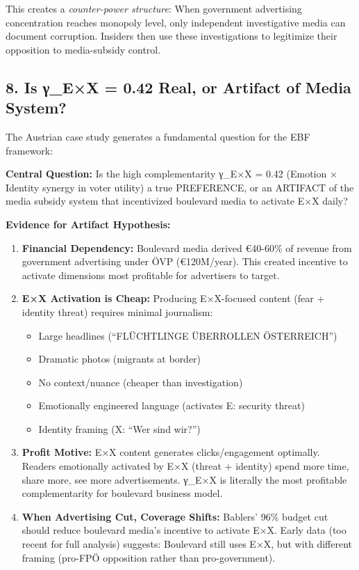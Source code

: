 This creates a \textit{counter-power structure}: When government advertising
concentration reaches monopoly level, only independent investigative media can
document corruption. Insiders then use these investigations to legitimize their
opposition to media-subsidy control.

\label{sec:dx-eex-implications}

\subsection*{8. Is γ_{E×X} = 0.42 Real, or Artifact of Media System?}

The Austrian case study generates a fundamental question for the EBF framework:

\textbf{Central Question:} Is the high complementarity γ_{E×X} = 0.42 (Emotion ×
Identity synergy in voter utility) a true PREFERENCE, or an ARTIFACT of the media
subsidy system that incentivized boulevard media to activate E×X daily?

\textbf{Evidence for Artifact Hypothesis:}

\begin{enumerate}
\item \textbf{Financial Dependency:} Boulevard media derived €40-60\% of revenue
  from government advertising under ÖVP (€120M/year). This created incentive to
  activate dimensions most profitable for advertisers to target.

\item \textbf{E×X Activation is Cheap:} Producing E×X-focused content (fear +
  identity threat) requires minimal journalism:
  \begin{itemize}
  \item Large headlines (``FLÜCHTLINGE ÜBERROLLEN ÖSTERREICH'')
  \item Dramatic photos (migrants at border)
  \item No context/nuance (cheaper than investigation)
  \item Emotionally engineered language (activates E: security threat)
  \item Identity framing (X: ``Wer sind wir?'')
  \end{itemize}

\item \textbf{Profit Motive:} E×X content generates clicks/engagement optimally.
  Readers emotionally activated by E×X (threat + identity) spend more time,
  share more, see more advertisements. γ_{E×X} is literally the most profitable
  complementarity for boulevard business model.

\item \textbf{When Advertising Cut, Coverage Shifts:} Bablers' 96\% budget cut
  should reduce boulevard media's incentive to activate E×X. Early data (too
  recent for full analysis) suggests: Boulevard still uses E×X, but with
  different framing (pro-FPÖ opposition rather than pro-government).

\end{enumerate}

